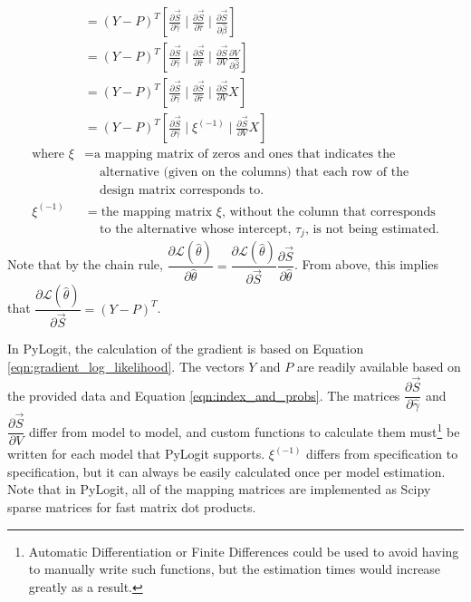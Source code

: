 \documentclass{article}
\begin{document}
\begin{equation}
\begin{aligned}
&= \left( Y - P \right)^T \left[ \frac{\partial \vec{S}}{\partial \hat{\gamma}} \mid \frac{\partial \vec{S}}{\partial \hat{\tau}} \mid \frac{\partial \vec{S}}{\partial \hat{\beta}} \right] \\
&= \left( Y - P \right)^T \left[ \frac{\partial \vec{S}}{\partial \hat{\gamma}} \mid \frac{\partial \vec{S}}{\partial \hat{\tau}} \mid \frac{\partial \vec{S}}{\partial V} \frac{\partial V}{\partial \hat{\beta}} \right] \\
&= \left( Y - P \right)^T \left[ \frac{\partial \vec{S}}{\partial \hat{\gamma}} \mid \frac{\partial \vec{S}}{\partial \hat{\tau}} \mid \frac{\partial \vec{S}}{\partial V} X \right] \\
&= \left( Y - P \right)^T \left[ \frac{\partial \vec{S}}{\partial \hat{\gamma}} \mid \xi^{(-1)} \mid \frac{\partial \vec{S}}{\partial V} X \right] \\
\textrm{where } \xi &= \textrm{a mapping matrix of zeros and ones that indicates the} \\
&\quad \ \textrm{alternative (given on the columns) that each row of the} \\
&\quad \ \textrm{design matrix corresponds to.} \\
\xi^{(-1)} &= \textrm{the mapping matrix $\xi$, without the column that corresponds}\\
&\quad \ \textrm{to the alternative whose intercept, $\tau _j$, is not being estimated.}
\end{aligned}
\end{equation}
Note that by the chain rule, $\dfrac{\partial \mathcal{L} \left( \hat{\theta} \right)}{\partial \hat{\theta}} = \dfrac{\partial \mathcal{L} \left( \hat{\theta} \right)}{\partial \vec{S}} \dfrac{\partial \vec{S}}{\partial \hat{\theta}}$. From above, this implies that $ \dfrac{\partial \mathcal{L} \left( \hat{\theta} \right)}{\partial \vec{S}} = \left( Y - P \right)^T$. \newpage

In PyLogit, the calculation of the gradient is based on Equation \ref{eqn:gradient_log_likelihood}. The vectors $Y$ and $P$ are readily available based on the provided data and Equation \ref{eqn:index_and_probs}. The matrices $\dfrac{\partial \vec{S}}{\partial \hat{\gamma}}$ and $\dfrac{\partial \vec{S}}{\partial V}$ differ from model to model, and custom functions to calculate them must\footnote{Automatic Differentiation or Finite Differences could be used to avoid having to manually write such functions, but the estimation times would increase greatly as a result.} be written for each model that PyLogit supports. $\xi^{(-1)}$ differs from specification to specification, but it can always be easily calculated once per model estimation. Note that in PyLogit, all of the mapping matrices are implemented as Scipy sparse matrices for fast matrix dot products.
\end{document}
